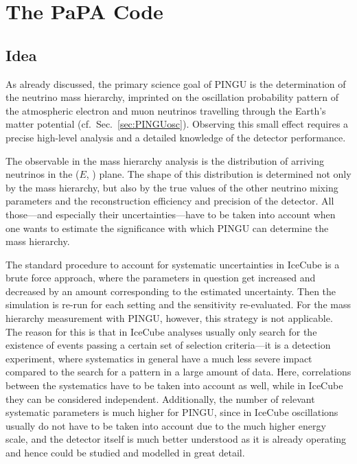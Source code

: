 \section{The PaPA Code}
\label{sec:papa}

\subsection{Idea}
\label{sec:sim_idea}

As already discussed, the primary science goal of PINGU is the determination of 
the neutrino mass hierarchy, imprinted on the oscillation probability pattern 
of the atmospheric electron and muon neutrinos travelling through the Earth's 
matter potential (cf.~Sec.~\ref{sec:PINGUosc}). Observing this small effect 
requires a precise high-level analysis and a detailed knowledge of the detector 
performance. 

The observable in the mass hierarchy analysis is the distribution of arriving 
neutrinos in the ($E$, \coszen) plane. The shape of this distribution is 
determined not only by the mass hierarchy, but also by the true values of the 
other neutrino mixing parameters and the reconstruction efficiency and 
precision of the detector. All those---and especially their 
uncertainties---have to be taken into account when one wants to estimate the 
significance with which PINGU can determine the mass hierarchy.

The standard procedure to account for systematic uncertainties in IceCube is a 
brute force approach, where the parameters in question get increased and 
decreased by an amount corresponding to the estimated uncertainty. Then the 
simulation is re-run for each setting and the sensitivity re-evaluated. For the 
mass hierarchy measurement with PINGU, however, this strategy is not 
applicable. The reason for this is that in IceCube analyses usually only search 
for the existence of events passing a certain set of selection criteria---it is 
a detection experiment, where systematics in general have a much less severe 
impact compared to the search for a pattern in a large amount of data. Here, 
correlations between the systematics have to be taken into account as well, 
while in IceCube they can be considered independent. Additionally, the number 
of relevant systematic parameters is much higher for PINGU, since in IceCube 
oscillations usually do not have to be taken into account due to the much 
higher energy scale, and the detector itself is much better understood as it is 
already operating and hence could be studied and modelled in great detail.

